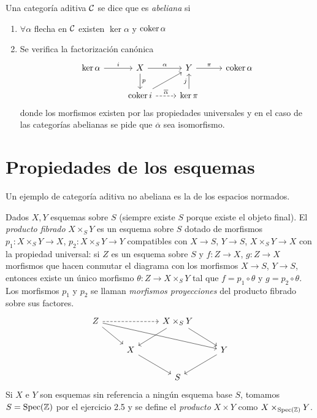 \documentclass[GA.tex]{subfiles}
\begin{document}
\begin{defi}
Una categoría aditiva $\mathcal{C}$ se dice que es \emph{abeliana} si
\begin{enumerate}
\item $\forall\alpha$ flecha en $\mathcal{C}$ existen $\ker\alpha$ y $\operatorname{coker}\alpha$
\item Se verifica la factorización canónica
\[
\begin{tikzcd}
\ker\alpha\arrow[r, "i"] & X\arrow[r, "\alpha"]\arrow[d, "p"] & Y\arrow[r, "\pi"] & \coker\alpha\\
&     \coker i\arrow[ur] \arrow[r, dashed, "\overline{\alpha}"] & \ker\pi\arrow[u, "j"] &
\end{tikzcd}
\]
donde los morfismos existen por las propiedades universales y en el caso de las categorías abelianas se pide que $\overline{\alpha}$ sea isomorfismo. 
\end{enumerate}

\end{defi}

\section{Propiedades de los esquemas}

Un ejemplo de categoría aditiva no abeliana es la de los espacios normados.

\begin{defi}
Dados $X,Y$ esquemas sobre $S$ (siempre existe $S$ porque existe el objeto final). El \emph{producto fibrado} $X\times_S Y$ es un esquema sobre $S$ dotado de morfismos $p_1:X\times_S Y\to X$, $p_2:X\times_S Y\to Y$ compatibles con $X\to S$, $Y\to S$, $X\times_S Y\to X$ con la propiedad universal: si $Z$ es un esquema sobre $S$ y $f:Z\to X$, $g:Z\to X$ morfismos que hacen conmutar el diagrama con los morfismos $X\to S$, $Y\to S$, entonces existe un único morfismo $\theta:Z\to X\times_S Y$ tal que $f=p_1\circ\theta$ y $g=p_2\circ\theta$. Los morfismos $p_1$ y $p_2$ se llaman \emph{morfismos proyecciones} del producto fibrado sobre sus factores.
\[
\begin{tikzcd}
Z\arrow[rr, dashed]\arrow[dr]\arrow[drrr] & &X\times_S Y\arrow[dr]\arrow[dl] & \\
&                              X\arrow[dr] & & Y\arrow[dl]\\
& & S & 
\end{tikzcd}
\]
Si $X$ e $Y$ son esquemas sin referencia a ningún esquema base $S$, tomamos $S=\operatorname{Spec}(\mathbb{Z})$ por el ejercicio 2.5 y se define el \emph{producto} $X\times Y$ como $X\times_{\operatorname{Spec}(\mathbb{Z})}Y$.
\end{defi}
\end{document}
